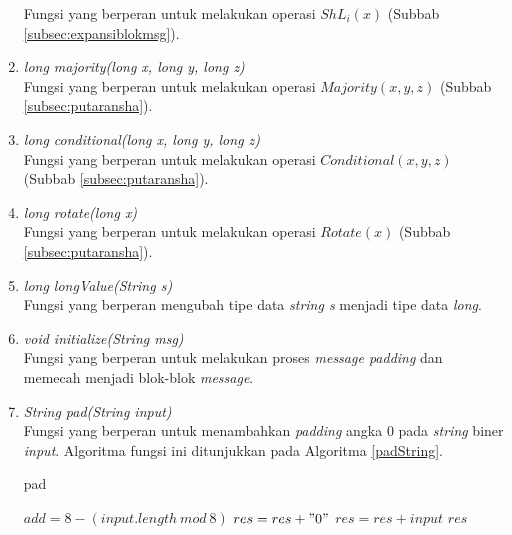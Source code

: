 \begin{enumerate}
	Fungsi yang berperan untuk melakukan operasi \begin{math}ShL_i(x)\end{math} (Subbab \ref{subsec:expansiblokmsg}).
	\item \textit{long majority(long x, long y, long z)} \\
	Fungsi yang berperan untuk melakukan operasi \begin{math}Majority(x,y,z)\end{math} (Subbab \ref{subsec:putaransha}).
	\item \textit{long conditional(long x, long y, long z)} \\
	Fungsi yang berperan untuk melakukan operasi \begin{math}Conditional(x,y,z)\end{math} (Subbab \ref{subsec:putaransha}).
	\item \textit{long rotate(long x)} \\
	Fungsi yang berperan untuk melakukan operasi \begin{math}Rotate(x)\end{math} (Subbab \ref{subsec:putaransha}).
	\item \textit{long longValue(String s)} \\
	Fungsi yang berperan mengubah tipe data \textit{string s} menjadi tipe data \textit{long}.
	\item \textit{void initialize(String msg)} \\
	Fungsi yang berperan untuk melakukan proses \textit{message padding} dan memecah menjadi blok-blok \textit{message}.
	\item \textit{String pad(String input)} \\
	Fungsi yang berperan untuk menambahkan \textit{padding} angka 0 pada \textit{string} biner \textit{input}. Algoritma fungsi ini ditunjukkan pada Algoritma \ref{padString}.
	
	\begin{algorithm}[H]
		\caption{pad}
		\label{padString}
		\begin{algorithmic}[1]
					\State \begin{math}add = 8 - (input.length \: mod\: 8)\end{math}
				\EndIf
					\State $res = res + "0"$
				\EndFor
				\State $res = res + input$
				\State \Return $res$
			\EndFunction
		\end{algorithmic}
	\end{algorithm}
	

\end{enumerate}
